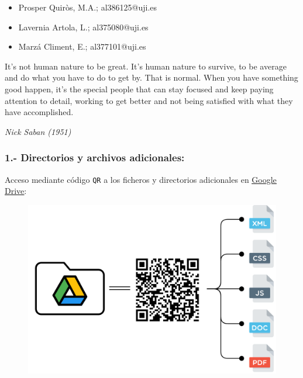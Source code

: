 \documentclass[11pt]{article}
\begin{document}
		
			\begin{itemize}
				\item[] \tabInicial Prosper Quiròs, M.A.; al386125@uji.es
				\item[] \tabInicial Lavernia Artola, L.; al375080@uji.es 
				\item[] \tabInicial Marzá Climent,  E.; al377101@uji.es
			\end{itemize}
		

	\thispagestyle{empty}
	
	\newpage
	\thispagestyle{empty}
	\vspace*{\fill}
	\setlength{\epigraphwidth}{0.65\textwidth}
	\epigraph{It's not human nature to be great. It's human nature to survive, to be average and do what you have to do to get by. That is normal. When you have something good happen, it's the special people that can stay focused and keep paying attention to detail, working to get better and not being satisfied with what they have accomplished.}{\textit{Nick Saban (1951)}}
	\vspace*{\fill}





	\newpage
	\thispagestyle{empty}
	\hrulefill
	\subsubsection*{1.- Directorios y archivos adicionales:}
		Acceso mediante código \texttt{QR} a los ficheros y directorios adicionales en \href{https://drive.google.com/drive/folders/12UCiPFkPC_MBHPvq8_ZDBdCT33m3mgSp?usp=sharing}{\underline{Google Drive}}:

		\begin{figure}[H]
			\begin{center}
			\includegraphics[scale=0.15]{images/googledrive.png}
			\end{center}
		\end{figure}
\end{document}
